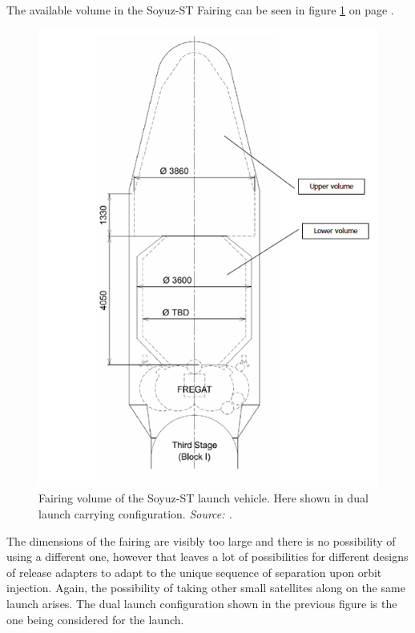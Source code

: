 The available volume in the Soyuz-ST Fairing can be seen in figure \ref{fig:soyuzvol} on page \pageref{fig:soyuzvol}.

\begin{figure}[ht!]
\centering
\includegraphics[scale = 0.5, angle=0]{chapters/img/soyuzvol.png}
\caption{Fairing volume of the Soyuz-ST launch vehicle. Here shown in dual launch carrying configuration.\emph{ Source: \cite{soyuzman}.}}
\label{fig:soyuzvol}
\end{figure} 

The dimensions of the fairing are visibly too large and there is no possibility of using a different one, however that leaves a lot of possibilities for different designs of release adapters to adapt to the unique sequence of separation upon orbit injection. Again, the possibility of taking other small satellites along on the same launch arises. The dual launch configuration shown in the previous figure is the one being considered for the launch.

